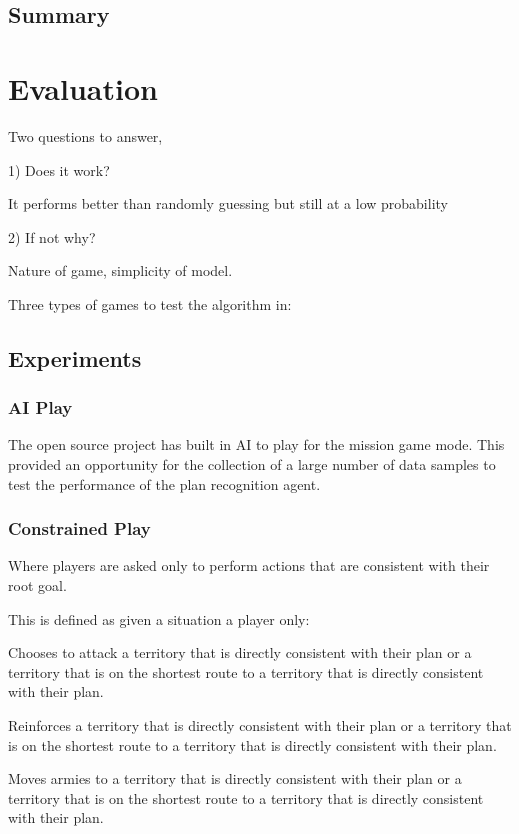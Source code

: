 \documentclass[parskip]{cs4rep}
\begin{document}
\section{Summary}

\chapter{Evaluation}

Two questions to answer, 

1) Does it work?

It performs better than randomly guessing but still at a low probability

2) If not why?

Nature of game, simplicity of model.

Three types of games to test the algorithm in:

\section{Experiments}

\subsection{AI Play}

The open source project has built in AI to play for the mission game mode. This provided an opportunity for the collection of a large number of data samples to test the performance of the plan recognition agent.

\subsection{Constrained Play}

Where players are asked only to perform actions that are consistent with their root goal.

This is defined as given a situation a player only:

Chooses to attack a territory that is directly consistent with their plan or a territory that is on the shortest route to a territory that is directly consistent with their plan.

Reinforces a territory that is directly consistent with their plan or a territory that is on the shortest route to a territory that is directly consistent with their plan.

Moves armies to a territory that is directly consistent with their plan or a territory that is on the shortest route to a territory that is directly consistent with their plan.
\end{document}
